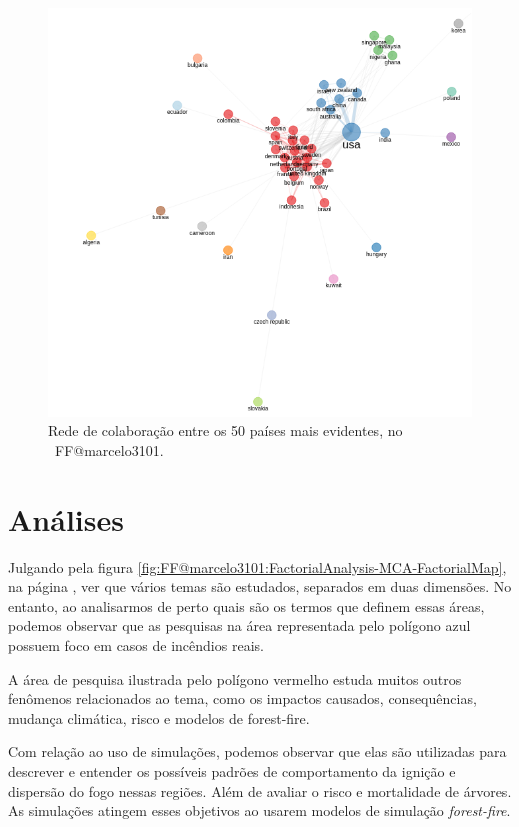\begin{figure}
    \centering
    \includegraphics[width=1\textwidth]{exploratory-data-analysis/marcelo3101/PesqBibliogr/ForestFire/WoS-20221204/assets/CollabCountries.png}
    \caption{Rede de colaboração entre os 50 países mais evidentes, no  \dataset\ FF@marcelo3101.}
    \label{fig:FF@marcelo3101:Collaboration-Network-50country}
\end{figure}

\section{Análises\label{FF@marcelo3101:Analises}}

Julgando pela figura \ref{fig:FF@marcelo3101:FactorialAnalysis-MCA-FactorialMap}, na página \pageref{fig:FF@marcelo3101:FactorialAnalysis-MCA-FactorialMap}, ver que vários temas são estudados, separados em duas dimensões. No entanto, ao analisarmos de perto quais são os termos que definem essas áreas, podemos observar que as pesquisas na área representada pelo polígono azul possuem foco em casos de incêndios reais. 

A área de pesquisa ilustrada pelo polígono vermelho estuda muitos outros fenômenos relacionados ao tema, como os impactos causados, consequências, mudança climática, risco e modelos de forest-fire.

Com relação ao uso de simulações, podemos observar que elas são utilizadas para descrever e entender os possíveis padrões de comportamento da ignição e dispersão do fogo nessas regiões. Além de avaliar o risco e mortalidade de árvores. As simulações atingem esses objetivos ao usarem modelos de simulação \textit{forest-fire}.

